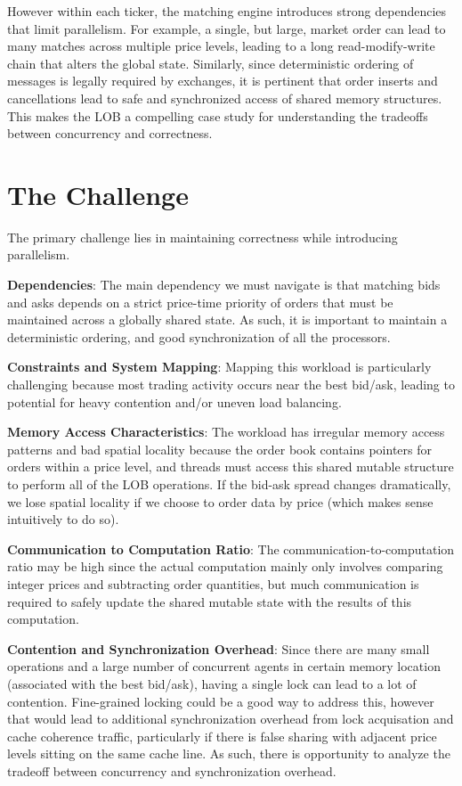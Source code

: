 \documentclass[11pt]{article}
\begin{document}
However within each ticker, the matching engine introduces strong dependencies that limit parallelism. For example, a single, but large, market order can lead to many matches across multiple price levels, leading to a long read-modify-write chain that alters the global state. Similarly, since deterministic ordering of messages is legally required by exchanges, it is pertinent that order inserts and cancellations lead to safe and synchronized access of shared memory structures. This makes the LOB a compelling case study for understanding the tradeoffs between concurrency and correctness.

\section*{The Challenge}

The primary challenge lies in maintaining correctness while introducing parallelism. 

\textbf{Dependencies}: The main dependency we must navigate is that matching bids and asks depends on a strict price-time priority of orders that must be maintained across a globally shared state. As such, it is important to maintain a deterministic ordering, and good synchronization of all the processors.

\textbf{Constraints and System Mapping}: Mapping this workload is particularly challenging because most trading activity occurs near the best bid/ask, leading to potential for heavy contention and/or uneven load balancing. 

\textbf{Memory Access Characteristics}: The workload has irregular memory access patterns and bad spatial locality because the order book contains pointers for orders within a price level, and threads must access this shared mutable structure to perform all of the LOB operations. If the bid-ask spread changes dramatically, we lose spatial locality if we choose to order data by price (which makes sense intuitively to do so).

\textbf{Communication to Computation Ratio}: The communication-to-computation ratio may be high since the actual computation mainly only involves comparing integer prices and subtracting order quantities, but much communication is required to safely update the shared mutable state with the results of this computation. 

\textbf{Contention and Synchronization Overhead}: Since there are many small operations and a large number of concurrent agents in certain memory location (associated with the best bid/ask), having a single lock can lead to a lot of contention. Fine-grained locking could be a good way to address this, however that would lead to additional synchronization overhead from lock acquisation and cache coherence traffic, particularly if there is false sharing with adjacent price levels sitting on the same cache line. As such, there is opportunity to analyze the tradeoff between concurrency and synchronization overhead.
\end{document}
